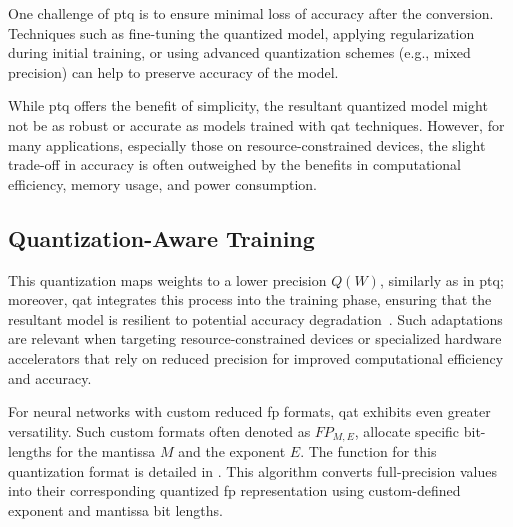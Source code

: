 One challenge of \gls{ptq} is to ensure minimal loss of accuracy after the conversion. Techniques such as fine-tuning the quantized model, applying regularization during initial training, or using advanced quantization schemes (e.g., mixed precision) can help to preserve accuracy of the model.

While \gls{ptq} offers the benefit of simplicity, the resultant quantized model might not be as robust or accurate as models trained with \gls{qat} techniques. However, for many applications, especially those on resource-constrained devices, the slight trade-off in accuracy is often outweighed by the benefits in computational efficiency, memory usage, and power consumption.


\subsection{Quantization-Aware Training}

This quantization maps weights to a lower precision \( Q(W) \), similarly as in \gls{ptq}; moreover, \gls{qat} integrates this process into the training phase, ensuring that the resultant model is resilient to potential accuracy degradation~\cite{krishnamoorthi2018quantizing}. Such adaptations are relevant when targeting resource-constrained devices or specialized hardware accelerators that rely on reduced precision for improved computational efficiency and accuracy.

For neural networks with custom reduced \gls{fp} formats, \gls{qat} exhibits even greater versatility. Such custom formats often denoted as \( FP_{M,E} \), allocate specific bit-lengths for the mantissa \( M \) and the exponent \( E \). The function for this quantization format is detailed in . This algorithm converts full-precision values into their corresponding quantized \gls{fp} representation using custom-defined exponent and mantissa bit lengths.

